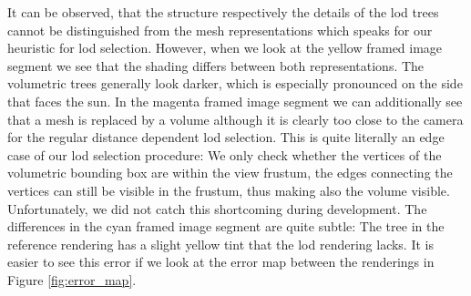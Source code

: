 It can be observed, that the structure respectively the details of the \acs{lod} trees cannot be distinguished from the mesh representations which speaks for our heuristic for \ac{lod} selection.
However, when we look at the yellow framed image segment we see that the shading differs between both representations.
The volumetric trees generally look darker, which is especially pronounced on the side that faces the sun.
In the magenta framed image segment we can additionally see that a mesh is replaced by a volume although it is clearly too close to the camera for the regular distance dependent \ac{lod} selection.
This is quite literally an edge case of our \ac{lod} selection procedure: We only check whether the vertices of the volumetric bounding box are within the view frustum, the edges connecting the vertices can still be visible in the frustum, thus making also the volume visible.
Unfortunately, we did not catch this shortcoming during development.
The differences in the cyan framed image segment are quite subtle: The tree in the reference rendering has a slight yellow tint that the \ac{lod} rendering lacks.
It is easier to see this error if we look at the \FLIP error map between the renderings in Figure \ref{fig:error_map}.
